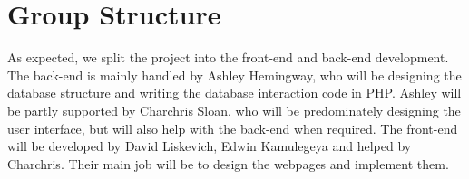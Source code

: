 \documentclass{article}
\begin{document}
\section{Group Structure}
As expected, we split the project into the front-end and back-end development. The back-end is mainly handled by Ashley Hemingway, who will be designing the database structure and writing the database interaction code in PHP. Ashley will be partly supported by Charchris Sloan, who will be predominately designing the user interface, but will also help with the back-end when required. The front-end will be developed by David Liskevich, Edwin Kamulegeya and helped by Charchris. Their main job will be to design the webpages and implement them.
\end{document}
